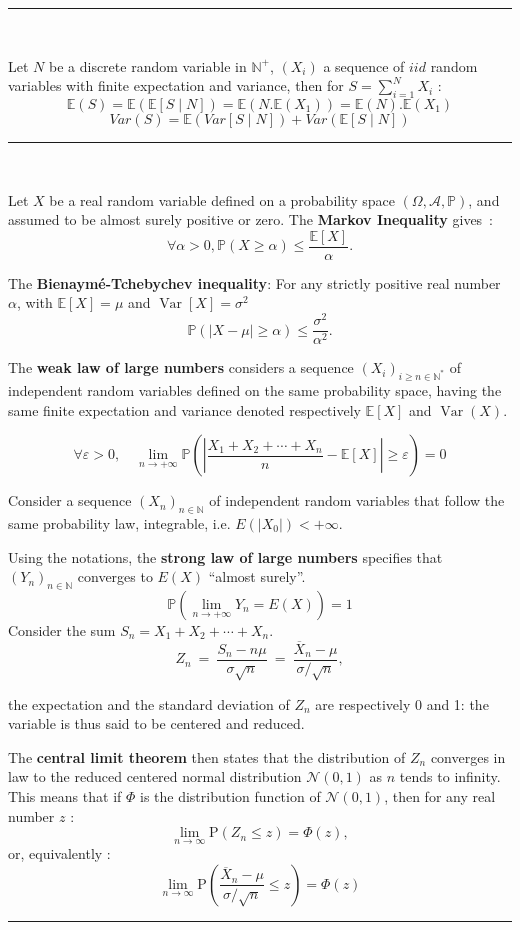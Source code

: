 \hrule
\begin{f}
	{\ }
	
	Let \(N\) be a discrete random variable in \(\mathbb{N}^+\), \(\left(X_i\right)\) a sequence of \(iid\) random variables with finite expectation and variance, then for \(\displaystyle S=\sum_{i=1}^{N}X_i\) :
	\[
	\mathbb{E}(S) = \mathbb{E} (\mathbb{E} [S \mid N]) = \mathbb{E} (N.\mathbb{E}(X_1)) = \mathbb{E}(N).\mathbb{E}(X_1)
	\]
	\[
	Var (S) = \mathbb{E} (Var [S \mid N]) + Var (\mathbb{E} [S \mid N])
	\]
\end{f}

\hrule
\begin{f} {\ }
	
	Let \(X\) be a real random variable defined on a probability space \(\left(\Omega,\mathcal A,\mathbb P\right)\), and assumed to be almost surely positive or zero. The \textbf{Markov Inequality} gives~:
	\[
	\forall \alpha >0, \mathbb P(X\geq \alpha)\leqslant\frac{\mathbb{E}[X]}{\alpha}.
	\]
	
	The \textbf{Bienaymé-Tchebychev inequality}: 
	For any strictly positive real number \(\alpha\), with \(\mathbb{E}[X]=\mu\) and \(\operatorname{Var}[X]=\sigma^2\)
	\[
	\mathbb{P}\left(\left|X-\mu\right| \geq \alpha \right) \leq \frac{\sigma^2}{\alpha^2}.
	\]
	
	The \textbf{weak law of large numbers} considers a sequence \((X_i)_{i\geq n\in\mathbb{N}^*}\) of independent random variables defined on the same probability space, having the same finite expectation and variance denoted respectively \(\mathbb{E}[X]\) and \(\operatorname{Var}(X)\).
	
	\[
	\forall\varepsilon>0,\quad \lim_{n \to +\infty} \mathbb{P}\left(\left|\frac{X_1+X_2+\cdots+X_n}{n} - \mathbb{E}[X]\right| \geq \varepsilon\right) = 0
	\]
	
	Consider a sequence \((X_n)_{n\in \mathbb{N}}\) of independent random variables that follow the same probability law, integrable, i.e. \(E(|X_0|)<+\infty\).
	
	Using the notations, the \textbf{strong law of large numbers} specifies that \((Y_n)_{n\in\mathbb{N}}\) converges to \(E(X)\) \enquote{almost surely}.
	\[
	\mathbb{P}\left(\lim_{n \to +\infty} Y_n = E(X)\right)=1
	\]
	Consider the sum \(S_n = X_1 + X_2 + \cdots + X_n\).
	\[   
	Z_n\ =\ \frac{S_n - n \mu}{\sigma \sqrt{n}}\ =\ \frac{\overline{X}_n-\mu}{\sigma/\sqrt{n}},
	\]
	
	the expectation and the standard deviation of \(Z_n\) are respectively 0 and 1: the variable is thus said to be centered and reduced.
	
	The \textbf{central limit theorem} then states that the distribution of \(Z_n\) converges in law to the reduced centered normal distribution \(\mathcal{N} (0 , 1)\) as \(n\) tends to infinity. This means that if \(\Phi\) is the distribution function of \(\mathcal{N} (0 , 1)\), then for any real number \(z\) :
	\[
	\lim_{n \to \infty} \mbox{P}(Z_n \le z) = \Phi(z),
	\]
	or, equivalently :
	\[
	\lim_{n\to\infty}\mbox{P}\left(\frac{\overline{X}_n-\mu}{\sigma/\sqrt{n}}\leq z\right)=\Phi(z)
	\]
\end{f}
\hrule


